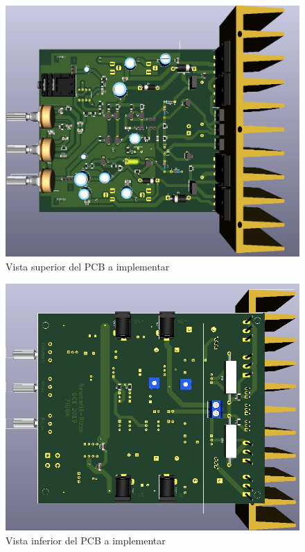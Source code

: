 \begin{figure}[H]
        \centering
        \includegraphics[scale=0.32]{img/circuito/PCB_3D_Top.jpeg}
        \caption{Vista superior del PCB a implementar}
        \label{fig::PCB_3D_T}
\end{figure}


\begin{figure}[H]
        \centering
        \includegraphics[scale=0.35]{img/circuito/PCB_3D_Bot.jpeg}
        \caption{Vista inferior del PCB a implementar}
        \label{fig::PCB_3D_B}
\end{figure}